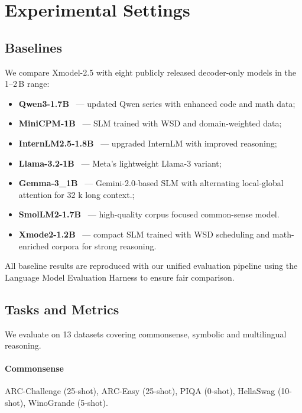 \section{Experimental Settings}

\subsection{Baselines}
We compare Xmodel-2.5 with eight publicly released decoder-only models in the 1--2\,B range:

\begin{itemize}
  \item \textbf{Qwen3-1.7B}~\citep{yang2025qwen3} — updated Qwen series with enhanced code and math data;
  \item \textbf{MiniCPM-1B}~\citep{minicpm2024} — SLM trained with WSD and domain-weighted data;
  \item \textbf{InternLM2.5-1.8B}~\citep{cai2024internlm2} — upgraded InternLM with improved reasoning;
  \item \textbf{Llama-3.2-1B}~\citep{llama3} — Meta's lightweight Llama-3 variant;
  \item \textbf{Gemma-3\_1B}~\citep{gemmateam2025gemma3} — Gemini-2.0-based SLM with alternating local-global attention for 32 k long context.;
  \item \textbf{SmolLM2-1.7B}~\citep{allal2025smollm2} — high-quality corpus focused common-sense model.
  \item \textbf{Xmode2-1.2B}~\citep{qun2024xmodel2} — compact SLM trained with WSD scheduling and math-enriched corpora for strong reasoning.
\end{itemize}

All baseline results are reproduced with our unified evaluation pipeline using the Language Model Evaluation Harness \citep{eval-harness} to ensure fair comparison.

\subsection{Tasks and Metrics}
We evaluate on 13 datasets covering commonsense, symbolic and multilingual reasoning.

\paragraph{Commonsense} ARC-Challenge \citep{clark2018think} (25-shot), ARC-Easy \citep{clark2018think} (25-shot), PIQA \citep{Bisk2019PIQARA} (0-shot), HellaSwag \citep{zellers2019hellaswag} (10-shot), WinoGrande \citep{Sakaguchi2021WinoGrande} (5-shot).


